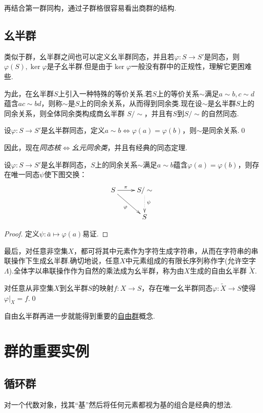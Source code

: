 再结合第一群同构，通过子群格很容易看出商群的结构.

\subsection{幺半群}
类似于群，幺半群之间也可以定义{\heiti 幺半群同态}，并且若$\varphi\colon S\to S'$是同态，则$\varphi(S),\ker\varphi$是子幺半群.但是由于$\ker\varphi$一般没有群中的正规性，理解它更困难些.

为此，在幺半群$S$上引入一种特殊的等价关系.若$S$上的等价关系$\sim$满足$a\sim b,c\sim d$蕴含$ac\sim bd$，则称$\sim$是$S$上的{\heiti 同余关系}，从而得到{\heiti 同余类}.现在设$\sim$是幺半群$S$上的同余关系，则全体同余类构成{\heiti 商幺半群} $S/\sim$，并且有$S$到$S/\sim$的{\heiti 自然同态}.
\begin{lemma}
	设$\varphi\colon S\to S'$是幺半群同态，定义$a\sim b\Leftrightarrow\varphi(a)=\varphi(b)$，则$\sim$是同余关系.\qed
\end{lemma}

因此，现在\emph{同态核$\Leftrightarrow$幺元同余类}，并且有经典的同态定理.
\begin{thm}
	设$\varphi\colon S\to S'$是幺半群同态，$S$上的同余关系$\sim$满足$a\sim b$蕴含$\varphi(a)=\varphi(b)$，则存在唯一同态$\psi$使下图交换：
	\[
		\xymatrix{
			S\ar[r]^(0.4)\pi\ar[rd]_\varphi&S/\sim\ar@{.>}[d]^(0.45)\psi\\
			&S
		}
	\]\hypertarget{thm:MonoidHomo}{}
\end{thm}
\begin{proof}
	定义$\psi\colon \bar a\mapsto\varphi(a)$易证.
\end{proof}

最后，对任意非空集$X$，都可将其中元素作为字符生成字符串，从而在字符串的串联操作下生成幺半群.确切地说，任意$X$中元素组成的有限长序列称作{\heiti 字}(允许{\heiti 空字} $\Lambda$).全体字以串联操作作为自然的乘法成为幺半群，称为由$X$生成的{\heiti 自由幺半群} $\widetilde{X}$.
\begin{prop}
	对任意从非空集$X$到幺半群$S$的映射$f\colon X\to S$，存在唯一幺半群同态$\varphi\colon\widetilde{X}\to S$使得$\varphi|_X=f$.\qed\hypertarget{prop:MonoidExtension}{}
\end{prop}

自由幺半群再进一步就能得到重要的\hyperref[section:FreeGroup]{自由群}概念.
\section{群的重要实例}
\subsection{循环群}\label{subsec:cyclic}
对一个代数对象，找其“基”然后将任何元素都视为基的组合是经典的想法.

